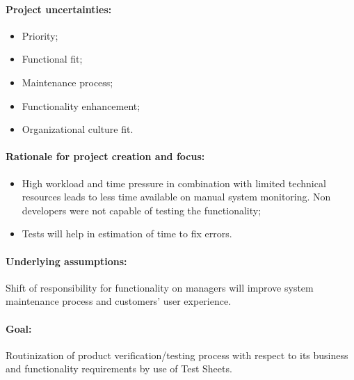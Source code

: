 \paragraph{Project uncertainties:}
\begin{itemize}
	\item Priority;
	\item Functional fit;
	\item Maintenance process;
	\item Functionality enhancement;
	\item Organizational culture fit.
\end{itemize}

\paragraph{Rationale for project creation and focus:} 
\begin{itemize}
	\item High workload and time pressure in combination with limited technical resources leads to less time available on manual system monitoring. Non developers were not capable of testing the functionality;
	\item Tests will help in estimation of time to fix errors.
\end{itemize}


\paragraph{Underlying assumptions:} Shift of responsibility for functionality  on managers will improve system maintenance process and customers' user experience. 

\paragraph{Goal:} Routinization of product verification/testing process with respect to its business and functionality requirements by use of Test Sheets.
